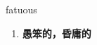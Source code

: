 
\begin{frame}
{\huge fatuous}
\begin{center}
\begin{enumerate}\Large
  \item \textbf{愚笨的，昏庸的}
\end{enumerate}
\end{center}
\end{frame}
